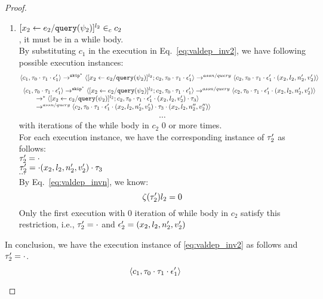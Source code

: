 {\begin{proof}
\begin{subproof}[Subproof]
\begin{enumerate}
\[  \rightarrow^{assn/query} 
  \config{{c}_2,  \vtrace_0 \cdot \vtrace_1 \cdot \event_1' \cdot \event_2'} 
 \]
%
\item{$[\mathrel{ {x}_2 \leftarrow e_2 / {\tt query}(\psi_2) }]^{l_2} \in_c c_2$}
\\
, it must be in a while body.
\\
 By substituting $c_1$ in the execution in Eq.~\ref{eq:valdep_inv2}, we have following possible execution instances:
  \[
  \langle c_1, \mathtt{\tau}_0 \cdot \mathtt{\tau}_1 \cdot \mathtt{\epsilon}_1' \rangle 
  \rightarrow^{\mathtt{skip}^*} 
  \langle [\mathrel{ {x}_2 \leftarrow e_2 / {\tt query}(\psi_2) }]^{l_2} ; {c}_2, \mathtt{\tau}_0 \cdot \mathtt{\tau}_1 \cdot \mathtt{\epsilon}_1' \rangle 
  \rightarrow^{assn/query} 
  \langle {c}_2,  \mathtt{\tau}_0 \cdot \mathtt{\tau}_1 \cdot \mathtt{\epsilon}_1' \cdot (x_2, l_2, n_2', v_2') \rangle 
 \]
%
  \[
  \begin{array}{l}
  \langle c_1, \mathtt{\tau}_0 \cdot \mathtt{\tau}_1 \cdot \mathtt{\epsilon}_1' \rangle 
  \rightarrow^{\mathtt{skip}^*} 
  \langle [\mathrel{ {x}_2 \leftarrow e_2 / {\tt query}(\psi_2) }]^{l_2} ; {c}_2, \mathtt{\tau}_0 \cdot \mathtt{\tau}_1 \cdot \mathtt{\epsilon}_1' \rangle 
  \rightarrow^{assn/query} 
  \langle {c}_2,  \mathtt{\tau}_0 \cdot \mathtt{\tau}_1 \cdot \mathtt{\epsilon}_1' \cdot (x_2, l_2, n_2', v_2') \rangle 
  \\ \qquad
  \rightarrow^{*} 
  \langle [\mathrel{ {x}_2 \leftarrow e_2 / {\tt query}(\psi_2) }]^{l_2} ; {c}_2, 
  \mathtt{\tau}_0 \cdot \mathtt{\tau}_1 \cdot \mathtt{\epsilon}_1' \cdot (x_2, l_2, v_2') \cdot \mathtt{\tau}_3 \rangle 
  \\ \qquad
  \rightarrow^{assn/query} 
  \langle {c}_2,  \mathtt{\tau}_0 \cdot \mathtt{\tau}_1 \cdot \mathtt{\epsilon}_1' \cdot (x_2, l_2, n_2', v_2') \cdot \mathtt{\tau}_3 \cdot (x_2, l_2, n_2'', v_2'') \rangle 
 \end{array}
 \]
\[
  \cdots
\] 
with iterations of the while body in $c_2$ $0$ or more times.
%
\\
%
For each execution instance, we have the corresponding instance of $\mathtt{\tau}_2'$ as follows:
\\
  $\mathtt{\tau}_2'  = \cdot$
\\
$\mathtt{\tau}_2' = \cdot (x_2, l_2, n_2', v_2') \cdot \mathtt{\tau}_3 $
%
\\
$\cdots$
%
\\
%
By Eq.~\ref{eq:valdep_invn}, we know:
%
\[
 \mathtt{\zeta}(\mathtt{\tau}_2') l_2 = 0
\]
%
Only the first execution with 0 iteration of while body in $c_2$ satisfy this restriction, i.e., $\mathtt{\tau}_2' = \cdot$ and $\mathtt{\epsilon}_2' = (x_2, l_2, n_2', v_2')$
%
\end{enumerate}
In conclusion, we have the execution instance of \ref{eq:valdep_inv2}  as follows and $\mathtt{\tau}_2' = \cdot$.
  \[
  \langle c_1, \mathtt{\tau}_0 \cdot \mathtt{\tau}_1 \cdot \mathtt{\epsilon}_1' \rangle 
\]
\end{subproof}
\end{proof}}
